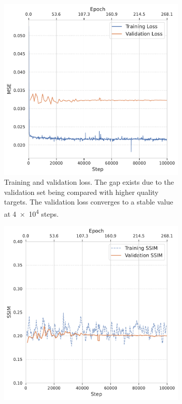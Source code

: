 \begin{figure}
    \centering
    \begin{subfigure}[t]{0.49\linewidth}
        \centering
        \includegraphics[width=1\linewidth]{images/loss_training_val.pdf}
        \caption{Training and validation loss. The gap exists due to the validation set being compared with higher quality targets. The validation loss converges to a stable value at \num{4e4} steps.}
        \label{fig:loss-training-val}
    \end{subfigure}
    \hfill
    \begin{subfigure}[t]{0.49\linewidth}
        \centering
        \includegraphics[width=1\linewidth]{images/ssim_training_val.pdf}

\end{subfigure}
\end{figure}
